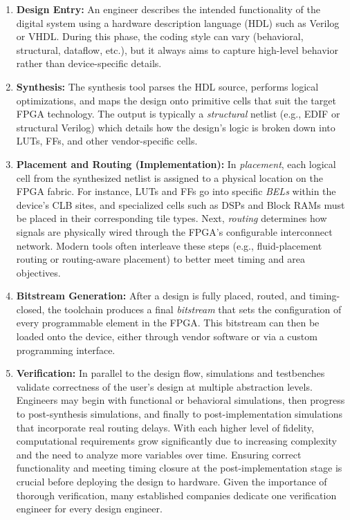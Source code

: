 \documentclass[twocolumn]{article}
\begin{document}
    \begin{enumerate}
        \item \textbf{Design Entry:} 
            An engineer describes the intended functionality of the digital system using a hardware description language (HDL) such as Verilog or VHDL. 
            During this phase, the coding style can vary (behavioral, structural, dataflow, etc.), but it always aims to capture high-level behavior rather than device-specific details.

        \item \textbf{Synthesis:} 
            The synthesis tool parses the HDL source, performs logical optimizations, and maps the design onto primitive cells that suit the target FPGA technology. 
            The output is typically a \emph{structural} netlist (e.g., EDIF or structural Verilog) which details how the design’s logic is broken down into LUTs, FFs, and other vendor-specific cells.

        \item \textbf{Placement and Routing (Implementation):} 
            In \emph{placement}, each logical cell from the synthesized netlist is assigned to a physical location on the FPGA fabric. 
            For instance, LUTs and FFs go into specific \emph{BELs} within the device’s CLB sites, and specialized cells such as DSPs and Block RAMs must be placed in their corresponding tile types. 
            Next, \emph{routing} determines how signals are physically wired through the FPGA’s configurable interconnect network. 
            Modern tools often interleave these steps (e.g., fluid-placement routing or routing-aware placement) to better meet timing and area objectives.

        \item \textbf{Bitstream Generation:} 
            After a design is fully placed, routed, and timing-closed, the toolchain produces a final \emph{bitstream} that sets the configuration of every programmable element in the FPGA. 
            This bitstream can then be loaded onto the device, either through vendor software or via a custom programming interface.

        \item \textbf{Verification:} 
            In parallel to the design flow, simulations and testbenches validate correctness of the user's design at multiple abstraction levels. 
            Engineers may begin with functional or behavioral simulations, then progress to post-synthesis simulations, and finally to post-implementation simulations that incorporate real routing delays. 
            With each higher level of fidelity, computational requirements grow significantly due to increasing complexity and the need to analyze more variables over time. 
            Ensuring correct functionality and meeting timing closure at the post-implementation stage is crucial before deploying the design to hardware. Given the importance of thorough verification, many established companies dedicate one verification engineer for every design engineer.

    \end{enumerate}
\end{document}
